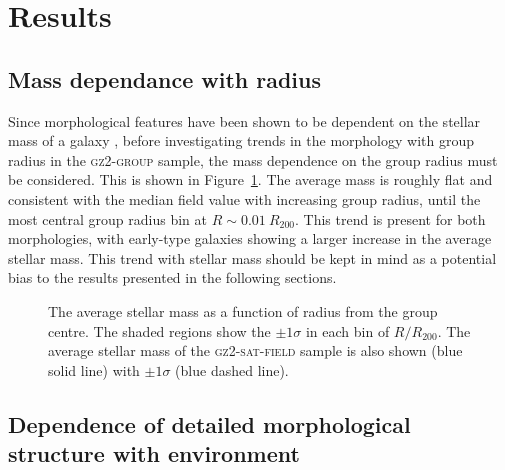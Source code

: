 \section{Results}\label{sec:results}

\subsection{Mass dependance with radius}

Since morphological features have been shown to be dependent on the stellar mass of a galaxy \citep[e.g. the increase in the bar fraction with stellar mass][]{skibba12}, before investigating trends in the morphology with group radius in the \textsc{gz2-group} sample, the mass dependence on the group radius must be considered. This is shown in Figure~\ref{fig:massdep}. The average mass is roughly flat and consistent with the median field value with increasing group radius, until the most central group radius bin at $R \sim 0.01~R_{200}$. This trend is present for both morphologies, with early-type galaxies showing a larger increase in the average stellar mass. This trend with stellar mass should be kept in mind as a potential bias to the results presented in the following sections. 

\begin{figure}
\caption[Average mass with group radius in the GZ2-GROUP sample]{The average stellar mass as a function of radius from the group centre. The shaded regions show the $\pm1\sigma$ in each bin of $R/R_{200}$. The average stellar mass of the \textsc{gz2-sat-field} sample is also shown (blue solid line) with $\pm1\sigma$ (blue dashed line).}
\label{fig:massdep}
\end{figure}

\subsection{Dependence of detailed morphological structure with environment}


